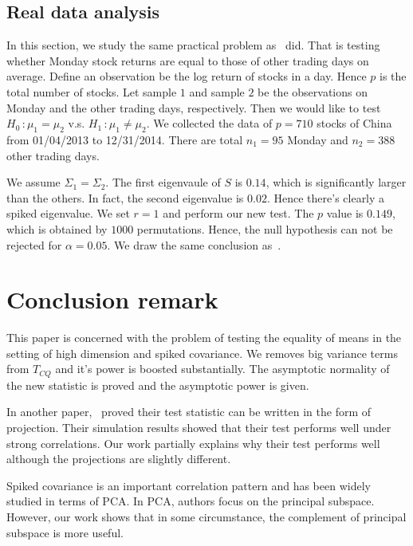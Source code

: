 \documentclass[review]{elsarticle}
\theoremstyle{plain}
\theoremstyle{definition}
\theoremstyle{remark}
\begin{document}
\subsection{Real data analysis}
In this section, we study the same practical problem as~\cite{Ma2015A} did. That is testing whether Monday stock returns are equal to those of other trading days on average. Define an observation be the log return of stocks in a day. Hence $p$ is the total number of stocks. Let sample $1$ and sample $2$ be the observations on Monday and the other trading days, respectively.  Then we would like to test $H_0\, :\mu_1=\mu_2$ v.s. $H_1\,:\mu_1\neq \mu_2$. We collected the data of $p=710$
 stocks of China
from 01/04/2013 to 12/31/2014. There are total $n_1=95$ Monday and $n_2=388$ other trading days. 

We assume $\Sigma_1=\Sigma_2$. The first eigenvaule of $S$ is $0.14$, which is significantly larger than the others.
In fact, the second eigenvalue is $0.02$.
Hence there's clearly a spiked eigenvalue. We set $r=1$ and perform our new test. The $p$ value is $0.149$, which is obtained by $1000$ permutations. Hence, the null hypothesis can not be rejected for $\alpha=0.05$. We draw the same conclusion as~\cite{Ma2015A}.

\section{Conclusion remark}

This paper is concerned with the problem of testing the equality of means in the setting of high dimension and spiked covariance. We removes big variance terms from $T_{CQ}$ and it's power is boosted substantially. The asymptotic normality of the new statistic is proved and the asymptotic power is given. %

In another paper,~\cite{Zhao2016A} proved their test statistic can be written in the form of projection. Their simulation results showed that their test performs well under strong correlations.
Our work partially explains why their test performs well although the projections are slightly different. 

 Spiked covariance is an important correlation pattern and has been widely studied in terms of PCA\@. In PCA, authors focus on the principal subspace. However, our work shows that in some circumstance, the complement of principal subspace is more useful. 
\end{document}
